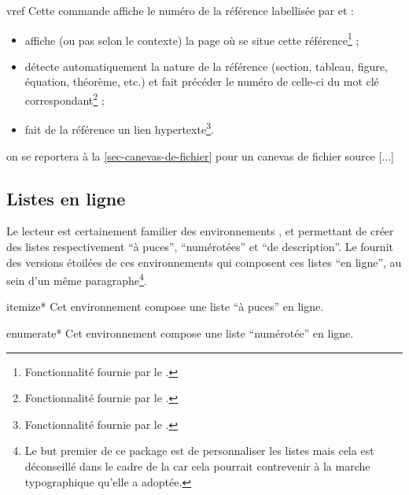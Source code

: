 \begin{docCommand}{vref}{}
  Cette commande affiche le numéro de la référence labellisée par 
  et :
  \begin{itemize}
  \item affiche (ou pas selon le contexte) la page où se situe cette
    référence\footnote{Fonctionnalité fournie par le .} ;
  \item détecte automatiquement la nature de la référence (section, tableau,
    figure, équation, théorème, etc.) et fait précéder le numéro de celle-ci du
    mot clé correspondant\footnote{Fonctionnalité fournie par le
      .} ;
  \item fait de la référence un lien hypertexte\footnote{Fonctionnalité fournie
      par le .}.
  \end{itemize}
\begin{bodycode}[listing and text,listing options={deletekeywords={[2]url,[1]math}}]
[...] on se reportera à la \vref{sec-canevas-de-fichier} pour un canevas de
fichier source [...]
\end{bodycode}
\end{docCommand}

\subsection{Listes en ligne}
\label{sec:listes-en-ligne}

Le lecteur est certainement familier des environnements
,  et
 permettant de créer des listes respectivement
\enquote{à puces}, \enquote{numérotées} et \enquote{de description}. Le
 fournit des versions étoilées de ces environnements qui
composent ces listes \enquote{en ligne}, \cad*{} au sein d'un même
paragraphe\footnote{Le but premier de ce package est de personnaliser les listes
  mais cela est déconseillé dans le cadre de la \gzt{} car cela pourrait
  contrevenir à la marche typographique qu'elle a adoptée.}.

\begin{docEnvironment}[doclang/environment content=liste]{itemize*}{}
  Cet environnement compose une liste \enquote{à puces} en ligne.
\end{docEnvironment}

\begin{docEnvironment}[doclang/environment content=liste]{enumerate*}{}
  Cet environnement compose une liste \enquote{numérotée} en ligne.
\end{docEnvironment}

